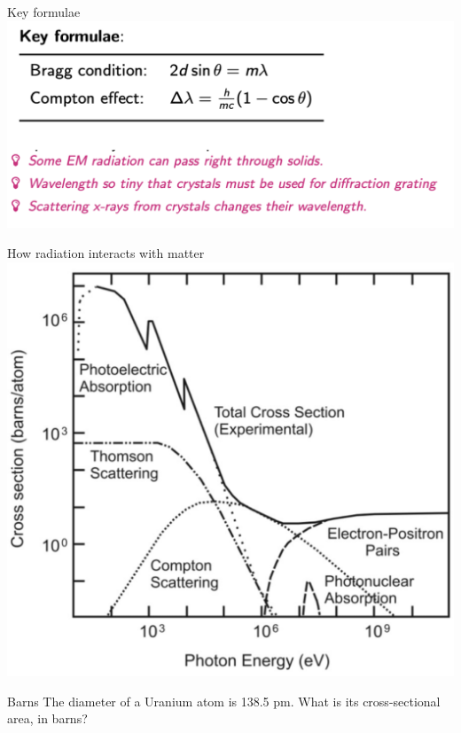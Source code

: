 \begin{frame}{Key formulae}
\small
\includegraphics[scale=0.3]{keyform}


\end{frame}


\begin{frame}{How radiation interacts with matter}
\small
\includegraphics[scale=0.3]{cross-secs}


\end{frame}



\begin{frame}{Barns}
\small
The diameter of a Uranium atom is 138.5 pm. What is its cross-sectional area, in barns?\\[1ex]
\vspace{10cm}

\end{frame}



